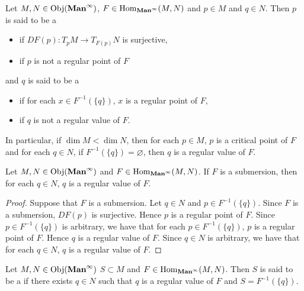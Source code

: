 \documentclass{book}
\begin{document}
	\begin{defn} 
		Let $M, N \in \operatorname{Obj}(\operatorname*{\text{\textbf{Man}}^{\infty}})$, $F \in \operatorname{Hom}_{\operatorname*{\text{\textbf{Man}}^{\infty}}}(M,N)$ and $p \in M$ and $q \in N$. Then $p$ is said to be a 
		\begin{itemize}
			\item {} if $DF(p):T_pM \rightarrow T_{F(p)} N$ is surjective,
			\item {} if $p$ is not a regular point of $F$
		\end{itemize} 
		and $q$ is said to be a 
		\begin{itemize}
			\item {} if for each $x \in F^{-1}(\{q\})$, $x$ is a regular point of $F$,
			\item {} if $q$ is not a regular value of $F$.
		\end{itemize} 
	\end{defn}

	\begin{note}
		In particular, if $\dim M < \dim N$, then for each $p \in M$, $p$ is a critical point of $F$ and for each $q \in N$, if $F^{-1}(\{q\}) = \varnothing$, then $q$ is a regular value of $F$. 
	\end{note}

	\begin{ex} 
		Let $M, N \in \operatorname{Obj}(\operatorname*{\text{\textbf{Man}}^{\infty}})$ and $F \in \operatorname{Hom}_{\operatorname*{\text{\textbf{Man}}^{\infty}}}(M,N)$. If $F$ is a submersion, then for each $q \in N$, $q$ is a regular value of $F$. 
	\end{ex}
	
	\begin{proof}
		Suppose that $F$ is a submersion. Let $q \in N$ and $p \in F^{-1}(\{q\})$. Since $F$ is a submersion, $DF(p)$ is surjective. Hence $p$ is a regular point of $F$. Since $p \in F^{-1}(\{q\})$ is arbitrary, we have that for each $p \in F^{-1}(\{q\})$, $p$ is a regular point of $F$. Hence $q$ is a regular value of $F$. Since $q \in N$ is arbitrary, we have that for each $q \in N$, $q$ is a regular value of $F$.
	\end{proof}
	
	\begin{defn} 
		Let $M, N \in \operatorname{Obj}(\operatorname*{\text{\textbf{Man}}^{\infty}})$ $S \subset M$ and $F \in \operatorname{Hom}_{\operatorname*{\text{\textbf{Man}}^{\infty}}}(M,N)$. Then $S$ is said to be a  if there exists $q \in N$ such that $q$ is a regular value of $F$ and $S = F^{-1}(\{q\})$.
	\end{defn}
	
\end{document}
